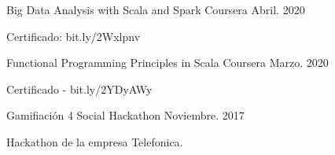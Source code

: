 

\begin{cventries}

  \cventry
    {} %
    {Big Data Analysis with Scala and Spark} %
    {Coursera} %
    {Abril. 2020} %
    {
      \begin{cvitems} %
        \item {Certificado: bit.ly/2Wxlpnv}
      \end{cvitems}
    }

  \cventry
    {} %
    {Functional Programming Principles in Scala} %
    {Coursera} %
    {Marzo. 2020} %
    {
      \begin{cvitems} %
        \item {Certificado - bit.ly/2YDyAWy}
      \end{cvitems}
    }

  \cventry
    {} %
    {Gamifiación 4 Social} %
    {Hackathon} %
    {Noviembre. 2017} %
    {
      \begin{cvitems} %
        \item {Hackathon de la empresa Telefonica.}
      \end{cvitems}
    }


\end{cventries}
